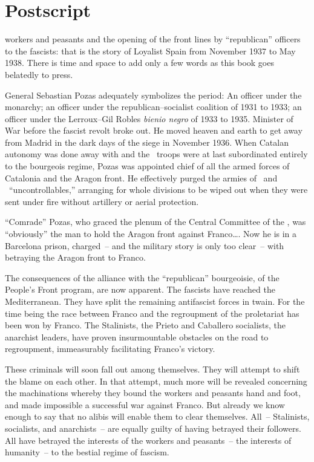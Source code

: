 \chapter{Postscript}

 workers and peasants and the opening of the front lines by ``republican'' officers to the fascists: that is the story of Loyalist Spain from November 1937 to May 1938. There is time and space to add only a few words as this book goes belatedly to press.

General Sebastian Pozas adequately symbolizes the period: An officer under the monarchy; an officer under the republican--socialist coalition of 1931 to 1933; an officer under the Lerroux--Gil Robles \emph{bienio negro} of 1933 to 1935. Minister of War before the fascist revolt broke out. He moved heaven and earth to get away from Madrid in the dark days of the siege in November 1936. When Catalan autonomy was done away with and the \CNT\ troops were at last subordinated entirely to the bourgeois regime, Pozas was appointed chief of all the armed forces of Catalonia and the Aragon front. He effectively purged the armies of  \CNT\ and \POUM\ ``uncontrollables,'' arranging for whole divisions to be wiped out when they were sent under fire without artillery or aerial protection.

``Comrade'' Pozas, who graced the plenum of the Central Committee of the \PSUC\kn, was ``obviously'' the man to hold the Aragon front against Franco\dots. Now he is in a Barcelona prison, charged~-- and the military story is only too clear~-- with betraying the Aragon front to Franco.

The consequences of the alliance with the \kn``republican'' bourgeoisie\kn, of the People’s Front program, are now apparent. The fascists have reached the Mediterranean. They have split the remaining antifascist forces in twain. For the time being the race between Franco and the regroupment of the proletariat has been won by Franco. The Stalinists, the Prieto and Caballero socialists, the anarchist leaders, have proven insurmountable obstacles on the road to regroupment, immeasurably facilitating Franco’s victory.

These criminals will soon fall out among themselves. They will attempt to shift the blame on each other. In that attempt, much more will be revealed concerning the machinations whereby they bound the workers and peasants hand and foot, and made impossible a successful war against Franco. But already we know enough to say that no alibis will enable them to clear themselves. All~-- Stalinists, socialists, and anarchists~-- are equally guilty of having betrayed their followers. All have betrayed the interests of the workers and peasants~-- the interests of humanity~-- to the bestial regime of fascism.

